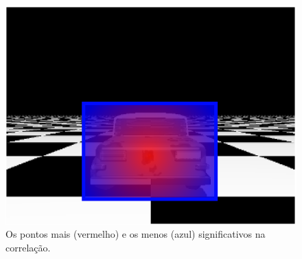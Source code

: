 \begin{figure}[H]
\includegraphics[width=\columnwidth]{images/imageErrorcontroled.eps}
\caption{Os pontos mais (vermelho) e os menos (azul) significativos na correlação.}
\label{fig:errorpondered}
\end{figure}

